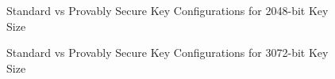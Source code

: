 \documentclass[]{final_report}
\theoremstyle{definition}
\begin{document}
\begin{figure}[H]
  
    \centering %
     \caption{Standard vs Provably Secure Key Configurations for 2048-bit Key Size}
    \begin{minipage}{\textwidth}
        \centering
        \label{fig:image1}
    \end{minipage}
      \label{keyGen_2048bit_table}
  \end{figure}
  
\begin{figure}[H]

    \centering %
     \caption{Standard vs Provably Secure Key Configurations for 3072-bit Key Size}
    \begin{minipage}{\textwidth}
        \centering
        \label{fig:image1}
    \end{minipage}
     \label{keyGen_3072bit_table}
\end{figure}
\end{document}
